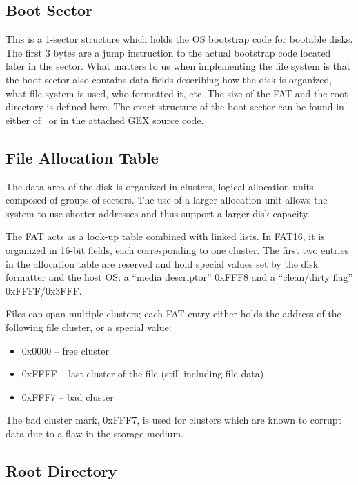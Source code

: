 \subsection{Boot Sector}

This is a 1-sector structure which holds the \gls{OS} bootstrap code for bootable disks. The first 3 bytes are a jump instruction to the actual bootstrap code located later in the sector. What matters to us when implementing the file system is that the boot sector also contains data fields describing how the disk is organized, what file system is used, who formatted it, etc. The size of the \gls{FAT} and the root directory is defined here. The exact structure of the boot sector can be found in either of~\cite{ms-fat,fat16-brainy,fat16-maverick,fat16-phobos,fat-whitepaper} or in the attached GEX source code.

\subsection{File Allocation Table}

The data area of the disk is organized in clusters, logical allocation units composed of groups of sectors. The use of a larger allocation unit allows the system to use shorter addresses and thus support a larger disk capacity.

The \gls{FAT} acts as a look-up table combined with linked lists. In FAT16, it is organized in 16-bit fields, each corresponding to one cluster. The first two entries in the allocation table are reserved and hold special values set by the disk formatter and the host \gls{OS}: a ``media descriptor'' 0xFFF8 and a ``clean/dirty flag'' 0xFFFF/0x3FFF.

Files can span multiple clusters; each \gls{FAT} entry either holds the address of the following file cluster, or a special value:

\begin{itemize}[nosep]
	\item 0x0000 -- free cluster
	\item 0xFFFF -- last cluster of the file (still including file data)
	\item 0xFFF7 -- bad cluster
\end{itemize}

The bad cluster mark, 0xFFF7, is used for clusters which are known to corrupt data due to a flaw in the storage medium.

\subsection{Root Directory}

